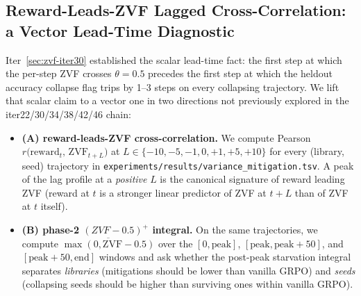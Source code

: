 
\subsection{Reward-Leads-ZVF Lagged Cross-Correlation: a Vector Lead-Time Diagnostic}
\label{sec:zvf-lag}
Iter~\ref{sec:zvf-iter30} established the scalar lead-time fact: the
first step at which the per-step ZVF crosses $\theta{=}0.5$
precedes the first step at which the heldout accuracy collapse flag
trips by 1--3 steps on every collapsing trajectory. We lift that scalar
claim to a vector one in two directions not previously explored in the
iter22/30/34/38/42/46 chain:
\begin{itemize}
\item \textbf{(A) reward-leads-ZVF cross-correlation.} We compute
Pearson $r\bigl(\mathrm{reward}_t,\, \mathrm{ZVF}_{t+L}\bigr)$ at
$L \in \{-10,-5,-1,0,+1,+5,+10\}$ for every (library, seed)
trajectory in \texttt{experiments/results/variance_mitigation.tsv}. A
peak of the lag profile at a \emph{positive} $L$ is the canonical
signature of reward leading ZVF (reward at $t$ is a stronger linear
predictor of ZVF at $t+L$ than of ZVF at $t$ itself).
\item \textbf{(B) phase-2 $(ZVF{-}0.5)^+$ integral.} On the same
trajectories, we compute
$\overline{\max(0,\mathrm{ZVF}{-}0.5)}$ over the $[0,\text{peak}]$,
$[\text{peak},\text{peak}{+}50]$, and $[\text{peak}{+}50,\text{end}]$
windows and ask whether the post-peak starvation integral separates
\textit{libraries} (mitigations should be lower than vanilla GRPO)
and \textit{seeds} (collapsing seeds should be higher than surviving
ones within vanilla GRPO).
\end{itemize}

